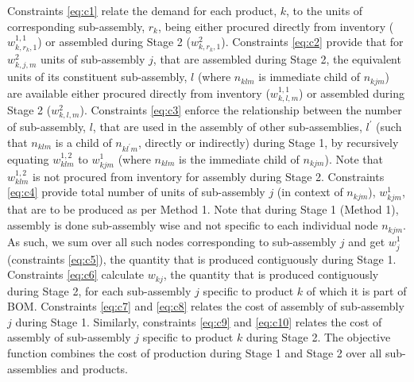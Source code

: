 \documentclass[twoside,onecolumn,12pt,letterpaper]{article}
\begin{document}
Constraints \ref{eq:c1} relate the demand for each product, $k$, to the units of corresponding sub-assembly, $r_k$, being either procured directly from inventory ($w_{k,r_k,1}^{1,1}$) or assembled during Stage 2 ($w_{k,r_k,1}^{2}$). Constraints \ref{eq:c2} provide that for $w_{k,j,m}^{2}$ units of sub-assembly $j$, that are assembled during Stage 2, the equivalent units of its constituent sub-assembly, $l$ (where $n_{klm}$ is immediate child of $n_{kjm}$) are available either procured directly from inventory ($w_{k,l,m}^{1,1}$) or assembled during Stage 2 ($w_{k,l,m}^{2}$). Constraints \ref{eq:c3} enforce the relationship between the number of sub-assembly, $l$, that are used in the assembly of other sub-assemblies, $l^{'}$ (such that $n_{klm}$ is a child of $n_{kl^{'}m}$, directly or indirectly) during Stage 1, by recursively equating $w_{klm}^{1,2}$ to $w_{kjm}^{1}$ (where $n_{klm}$ is the immediate child of $n_{kjm}$). Note that $w_{klm}^{1,2}$ is not procured from inventory for assembly during Stage 2. Constraints \ref{eq:c4} provide total number of units of sub-assembly $j$ (in context of $n_{kjm}$), $w_{kjm}^{1}$, that are to be produced as per Method 1. Note that during Stage 1 (Method 1), assembly is done sub-assembly wise and not specific to each individual node $n_{kjm}$. As such, we sum over all such nodes corresponding to sub-assembly $j$ and get $w_{j}^{1}$ (constraints \ref{eq:c5}), the quantity that is produced contiguously during Stage 1. Constraints \ref{eq:c6} calculate $w_{kj}$, the quantity that is produced contiguously during Stage 2, for each sub-assembly $j$ specific to product $k$ of which it is part of BOM. Constraints \ref{eq:c7} and \ref{eq:c8} relates the cost of assembly of sub-assembly $j$ during Stage 1. Similarly, constraints \ref{eq:c9} and \ref{eq:c10} relates the cost of assembly of sub-assembly $j$ specific to product $k$ during Stage 2. The objective function combines the cost of production during Stage 1 and Stage 2 over all sub-assemblies and products.
\end{document}
